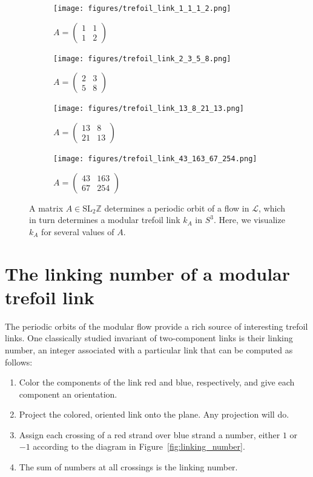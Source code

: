 \documentclass[12pt,twoside]{reedthesis}
\theoremstyle{definition}
\newcommand{\Z}{\mathbb{Z}}
\newcommand{\LS}{\mathcal{L}}
\newcommand{\SLZ}{\mathrm{SL}_2{\Z}}
\begin{document}
\begin{figure}[h!]
  \centering
  \begin{subfigure}[t]{0.48\textwidth}
    \centering
    \texttt{[image: figures/trefoil\_link\_1\_1\_1\_2.png]}
    \caption*{$A = \begin{pmatrix}1 & 1 \\ 1 & 2\end{pmatrix}$}
  \end{subfigure}
  \hfill
  \begin{subfigure}[t]{0.48\textwidth}
    \centering
    \texttt{[image: figures/trefoil\_link\_2\_3\_5\_8.png]}
    \caption*{$A = \begin{pmatrix}2 & 3 \\ 5 & 8\end{pmatrix}$}
  \end{subfigure}
  \begin{subfigure}[t]{0.48\textwidth}
    \centering
    \texttt{[image: figures/trefoil\_link\_13\_8\_21\_13.png]}
    \caption*{$A = \begin{pmatrix}13 & 8 \\ 21 & 13\end{pmatrix}$}
  \end{subfigure}
  \hfill
  \begin{subfigure}[t]{0.48\textwidth}
    \centering
    \texttt{[image: figures/trefoil\_link\_43\_163\_67\_254.png]}
    \caption*{$A = \begin{pmatrix}43 & 163\\ 67 & 254\end{pmatrix}$}
  \end{subfigure}
  \caption{A matrix $A \in \SLZ$ determines a periodic orbit of a flow in $\LS$, which in turn determines a modular trefoil link $k_A$ in $S^3$. Here, we visualize $k_A$ for several values of $A$.}
  \label{fig:trefoil_links}
\end{figure}

\section{The linking number of a modular trefoil link}

The periodic orbits of the modular flow provide a rich source of interesting trefoil links.
One classically studied invariant of two-component links is their linking number, an integer associated with a particular link that can be computed as follows:

\begin{enumerate}
  \item Color the components of the link red and blue, respectively, and give each component an orientation.
  \item Project the colored, oriented link onto the plane. Any projection will do.
  \item Assign each crossing of a red strand over blue strand a number, either $1$ or $-1$ according to the diagram in Figure~\ref{fig:linking_number}.
  \item The sum of numbers at all crossings is the linking number.
\end{enumerate}
\end{document}

